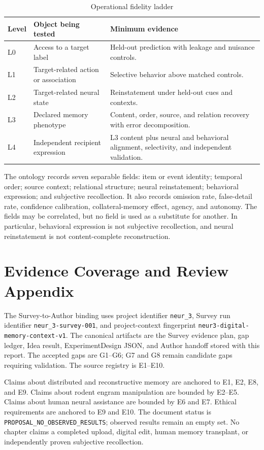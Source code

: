 \documentclass[conference]{IEEEtran}
\begin{document}
\begin{table}[h]
\caption{Operational fidelity ladder}
\label{tab:appendix_ladder}
\centering
\footnotesize
\setlength{\tabcolsep}{2pt}
\begin{tabular}{p{}p{}p{}}
\toprule
Level & Object being tested & Minimum evidence \\
\midrule
L0 & Access to a target label & Held-out prediction with leakage and nuisance controls. \\
L1 & Target-related action or association & Selective behavior above matched controls. \\
L2 & Target-related neural state & Reinstatement under held-out cues and contexts. \\
L3 & Declared memory phenotype & Content, order, source, and relation recovery with error decomposition. \\
L4 & Independent recipient expression & L3 content plus neural and behavioral alignment, selectivity, and independent validation. \\
\bottomrule
\end{tabular}
\end{table}

The ontology records seven separable fields: item or event identity; temporal order; source context; relational structure; neural reinstatement; behavioral expression; and subjective recollection. It also records omission rate, false-detail rate, confidence calibration, collateral-memory effect, agency, and autonomy. The fields may be correlated, but no field is used as a substitute for another. In particular, behavioral expression is not subjective recollection, and neural reinstatement is not content-complete reconstruction.

\section{Evidence Coverage and Review Appendix}
The Survey-to-Author binding uses project identifier \texttt{neur\_3}, Survey run identifier \texttt{neur\_3-survey-001}, and project-context fingerprint \texttt{neur3-digital-memory-context-v1}. The canonical artifacts are the Survey evidence plan, gap ledger, Idea result, ExperimentDesign JSON, and Author handoff stored with this report. The accepted gaps are G1--G6; G7 and G8 remain candidate gaps requiring validation. The source registry is E1--E10.

Claims about distributed and reconstructive memory are anchored to E1, E2, E8, and E9. Claims about rodent engram manipulation are bounded by E2--E5. Claims about human neural assistance are bounded by E6 and E7. Ethical requirements are anchored to E9 and E10. The document status is \texttt{PROPOSAL\_NO\_OBSERVED\_RESULTS}; observed results remain an empty set. No chapter claims a completed upload, digital edit, human memory transplant, or independently proven subjective recollection.
\end{document}

